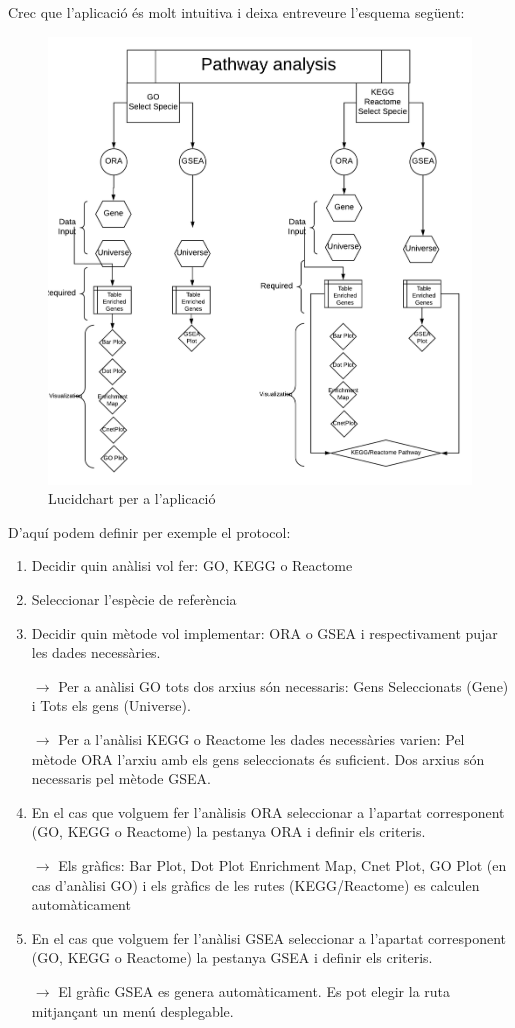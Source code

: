 Crec que l'aplicació és molt intuitiva i deixa entreveure l'esquema següent:

\begin{figure}[H]
\centering
\includegraphics[width=.9\textwidth]{figures/LucidChart} 
\caption{Lucidchart per a l'aplicació}
\end{figure}

D'aquí podem definir per exemple el protocol:
\begin{enumerate}
\item Decidir quin anàlisi vol fer: GO, KEGG o Reactome
\item Seleccionar l'espècie de referència
\item Decidir quin mètode vol implementar: ORA o GSEA i respectivament pujar les dades necessàries.

$\rightarrow$ Per a anàlisi GO tots dos arxius són necessaris: Gens Seleccionats (Gene) i Tots els gens (Universe). 

$\rightarrow$ Per a l'anàlisi KEGG o Reactome les dades necessàries varien: Pel mètode ORA l'arxiu amb els gens seleccionats és suficient. Dos arxius són necessaris pel mètode GSEA.
\item En el cas que volguem fer l'anàlisis ORA seleccionar a l'apartat corresponent (GO, KEGG o Reactome) la pestanya ORA i definir els criteris.

$\rightarrow$ Els gràfics: Bar Plot, Dot Plot Enrichment Map, Cnet Plot, GO Plot (en cas d'anàlisi GO) i els gràfics de les rutes (KEGG/Reactome) es calculen automàticament

\item En el cas que volguem fer l'anàlisi GSEA seleccionar a l'apartat corresponent (GO, KEGG o Reactome) la pestanya GSEA i definir els criteris.

$\rightarrow$ El gràfic GSEA es genera automàticament. Es pot elegir la ruta mitjançant un menú desplegable.

\end{enumerate}


